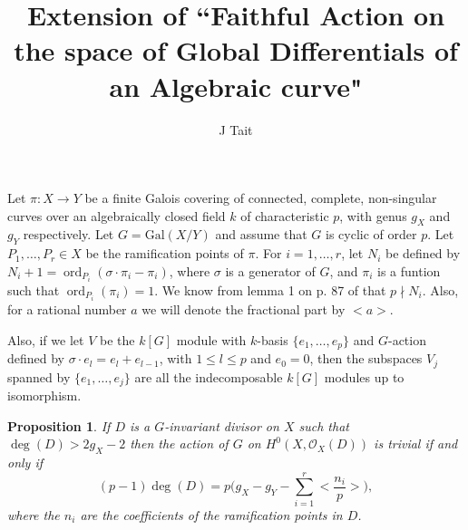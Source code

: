 \documentclass[11pt]{article} %
\title{Extension of ``Faithful Action on the space of Global Differentials of an Algebraic curve"}
\author{J Tait}
\newtheorem{prop}{Proposition}
\DeclareMathOperator{\ord}{ord}
\begin{document}
\maketitle

Let $\pi :X \rightarrow Y$ be a finite Galois covering of connected, complete, non-singular curves over an algebraically closed field $k$ of characteristic $p$, with genus $g_X$ and $g_Y$ respectively. Let $G=\mbox{Gal}(X/Y)$ and assume that $G$ is cyclic of order $p$. Let $P_1,\ldots ,P_r\in X$ be the ramification points of $\pi$. For $i=1,\ldots ,r$, let $N_i$ be defined by $N_i+1=\ord_{P_i}(\sigma\cdot\pi_i-\pi_i)$, where $\sigma$ is a generator of $G$, and $\pi_i$ is a funtion such that $\ord_{P_i}(\pi_i)=1$. We know from lemma 1 on p. 87 of \citep{naka} that $p\nmid N_i$. Also, for a rational number $a$ we will denote the fractional part by $<a>$.

Also, if we let $V$ be the $k[G]$ module with $k$-basis $\{e_1,\ldots ,e_p\}$ and $G$-action defined by $\sigma\cdot e_l=e_l+e_{l-1}$, with $1\leq l\leq p$ and $e_0=0$, then the subspaces $V_j$ spanned by $\{e_1,\ldots ,e_j\}$ are all the indecomposable $k[G]$ modules up to isomorphism.
\\
\begin{prop}
If $D$ is a $G$-invariant divisor on $X$ such that $\deg(D)>2g_X-2$ then the action of $G$ on $H^0(X,\mathscr{O}_X(D))$ is trivial if and only if
\[ (p-1)\deg(D)=p\Big(g_X-g_Y-\sum_{i=1}^r\Big<\frac{n_i}{p}\Big>\Big),\]
where the $n_i$ are the coefficients of the ramification points in $D$. 
\end{prop}
\end{document}
